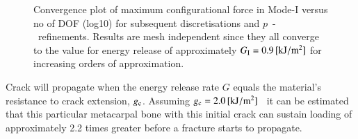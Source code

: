 \documentclass[review]{elsarticle}
\numberwithin{equation}{section}
\begin{document}
\begin{figure}[h!]
	\centering
	
	\caption{Convergence plot of maximum configurational force in Mode-I versus no of DOF (log10) for subsequent discretisations and $p$~-~refinements. Results are mesh independent since they all converge to the value for energy release of approximately $ G_{\rm I} = 0.9 \, [\mathrm{kJ} / \mathrm{m}^2]$ for increasing orders of approximation. }
	\label{fig:max_g1_convergece}
\end{figure}
Crack will propagate when the energy release rate $G$ equals the material's resistance to crack extension, $g_{\rm c}$. Assuming $g_{\rm c} = 2.0\,[\mathrm{ kJ/m^2}]$~\citep{gasser2007numerical} it can be estimated that this particular metacarpal bone with this initial crack can sustain loading of approximately 2.2 times greater before a fracture starts to propagate. 
\end{document}
